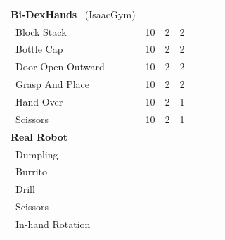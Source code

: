\begin{table}[t]
\begin{minipage}{.5\linewidth}
\begin{tabular}{lcccccc}


\textbf{Bi-DexHands}~\citep{chen2022bidexhands} (IsaacGym) \\

~Block Stack & 10 & 2 & 2\\
~Bottle Cap & 10 & 2 & 2 \\
~Door Open Outward & 10 & 2 & 2 \\
~Grasp And Place & 10 & 2 & 2 \\
~Hand Over & 10 & 2 & 1 \\
~Scissors & 10 & 2 & 1 \\





\midrule
\textbf{Real Robot}\\
~Dumpling  & \\
~Burrito & \\
~Drill & \\
~Scissors & \\
~In-hand Rotation~\citep{yuan2023robot_synthethesia} & \\
\bottomrule
\end{tabular}
 \end{minipage}



\end{table}
